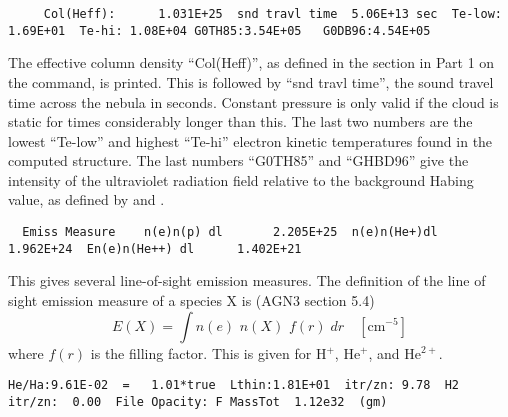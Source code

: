 {\setverbatimfontsize{\tiny}
\begin{verbatim}
     Col(Heff):      1.031E+25  snd travl time  5.06E+13 sec  Te-low: 1.69E+01  Te-hi: 1.08E+04 G0TH85:3.54E+05   G0DB96:4.54E+05
\end{verbatim}
}

The effective column density ``Col(Heff)'', as defined in the section
in Part 1 on the  command, is printed.
This is followed by ``snd travl time'',
the sound travel time across the nebula
in seconds.
Constant pressure is only valid if the cloud is static for
times considerably longer than this.
The last two numbers are the lowest
``Te-low'' and highest ``Te-hi'' electron kinetic temperatures found in
the computed structure.
The last numbers ``G0TH85'' and ``GHBD96'' give
the intensity of the ultraviolet radiation field relative to the background
Habing value, as defined by \citet{Tielens1985a} and \citet{Bertoldi1996}.
{\setverbatimfontsize{\tiny}
\begin{verbatim}
  Emiss Measure    n(e)n(p) dl       2.205E+25  n(e)n(He+)dl         1.962E+24  En(e)n(He++) dl      1.402E+21
\end{verbatim}
}

This gives several line-of-sight emission measures.
The definition of
the line of sight emission measure of a species X is
(AGN3 section 5.4)
\begin{equation}
E\left( X \right) = \int {n\left( e \right)} \,\,n\left( X
\right)\,\,f(r)\;dr\quad   [\mathrm{cm}^{-5}]%
\end{equation}
where $f(r)$ is the filling factor.  This is given for H$^+$, He$^+$, and
He$^{2+}$.
{\setverbatimfontsize{\tiny}
\begin{verbatim}
He/Ha:9.61E-02  =   1.01*true  Lthin:1.81E+01  itr/zn: 9.78  H2 itr/zn:  0.00  File Opacity: F MassTot  1.12e32  (gm)
\end{verbatim}
}


